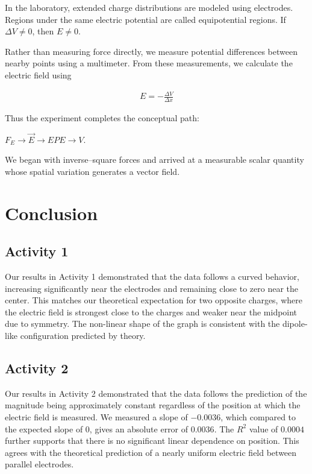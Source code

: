 \documentclass[12pt]{article}
\begin{document}
In the laboratory, extended charge distributions are modeled using electrodes.
Regions under the same electric potential are called equipotential regions.
If $\Delta V \neq 0$, then $E \neq 0$.

Rather than measuring force directly, we measure potential differences
between nearby points using a multimeter. From these measurements, we
calculate the electric field using

\begin{align*}
E = -\frac{\Delta V}{\Delta x}
\end{align*}

Thus the experiment completes the conceptual path:

$F_E \rightarrow \vec{E} \rightarrow EPE \rightarrow V$.

We began with inverse–square forces and arrived at a measurable scalar
quantity whose spatial variation generates a vector field.

\section{Conclusion}

\subsection*{Activity 1}
Our results in Activity 1 demonstrated that the data follows a curved behavior,
increasing significantly near the electrodes and remaining close to zero near
the center. This matches our theoretical expectation for two opposite charges,
where the electric field is strongest close to the charges and weaker near the
midpoint due to symmetry. The non-linear shape of the graph is consistent with
the dipole-like configuration predicted by theory.

\subsection*{Activity 2}
Our results in Activity 2 demonstrated that the data follows the prediction of
the magnitude being approximately constant regardless of the position at which
the electric field is measured. We measured a slope of $-0.0036$, which compared
to the expected slope of $0$, gives an absolute error of $0.0036$. The $R^2$
value of $0.0004$ further supports that there is no significant linear
dependence on position. This agrees with the theoretical prediction of a nearly
uniform electric field between parallel electrodes.
\end{document}
